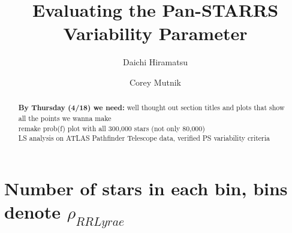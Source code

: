 \documentclass[aps,prb,twocolumn,superscriptaddress]{revtex4-1}
\begin{document}
\title{Evaluating the Pan-STARRS Variability Parameter}


%


\author{Daichi Hiramatsu}
\author{Corey Mutnik}



\begin{abstract}
\textbf{By Thursday (4/18) we need:} well thought out section titles and plots that show all the points we wanna make\\

remake prob(f) plot with all 300,000 stars (not only 80,000)\\

LS analysis on ATLAS Pathfinder Telescope data, verified PS variability criteria
\end{abstract}

\maketitle    



\section{Number of stars in each bin, bins denote $\rho_{RRLyrae}$}
\end{document}
